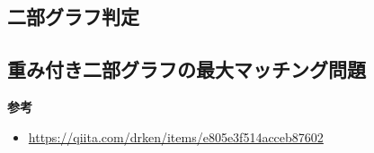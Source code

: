\documentclass{jlreq}
\begin{document}
\vspace{0.5cm}

\subsection{二部グラフ判定}

\subsection{重み付き二部グラフの最大マッチング問題}

\textbf{参考} \\
\begin{itemize}
  \item \url{https://qiita.com/drken/items/e805e3f514acceb87602}
\end{itemize}
\end{document}

